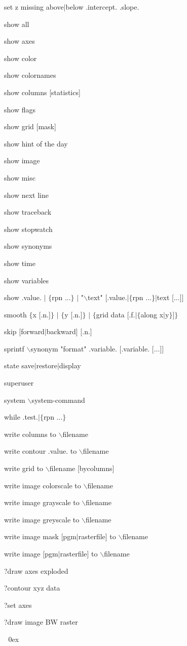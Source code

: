 set z missing above$\mid$below .intercept. .slope.

show all

show axes

show color

show colornames

show columns [statistics]

show flags

show grid [mask]

show hint of the day

show image

show misc

show next line

show traceback

show stopwatch

show synonyms

show time

show variables

show .value. $\mid$ $\lbrace$rpn ...$\rbrace$ $\mid$ "$\backslash$text" [.value.$\mid$$\lbrace$rpn ...$\rbrace$$\mid$text [...]]

smooth $\lbrace$x [.n.]$\rbrace$ $\mid$ $\lbrace$y [.n.]$\rbrace$ $\mid$ $\lbrace$grid data [.f.$\mid$$\lbrace$along x$\mid$y$\rbrace$]$\rbrace$

skip [forward$\mid$backward] [.n.]

sprintf $\backslash$synonym "format" .variable. [.variable. [...]]

state save$\mid$restore$\mid$display

superuser

system $\backslash$system-command

while .test.$\mid$$\lbrace$rpn ...$\rbrace$

write columns to $\backslash$filename

write contour .value. to $\backslash$filename

write grid to $\backslash$filename [bycolumns]

write image colorscale to $\backslash$filename

write image grayscale to $\backslash$filename

write image greyscale to $\backslash$filename

write image mask [pgm$\mid$rasterfile] to $\backslash$filename

write image [pgm$\mid$rasterfile] to $\backslash$filename

?draw axes exploded

?contour xyz data

?set axes

?draw image BW raster


\endexample
\parindent 0ex

\notice

\bye
